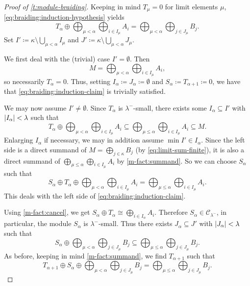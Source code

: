 \documentclass[a4paper,11pt,oneside]{amsart}
\theoremstyle{remark}
\DeclarePairedDelimiter{\card}{\lvert}{\rvert}
\newcommand{\cC}{\mathcal C}
\begin{document}
\begin{proof}[Proof of \cref{t:module-braiding}]
  Keeping in mind $T_\mu=0$ for limit elements $\mu$, \cref{eq:braiding:induction-hypothesis} yields
  \begin{equation} \label{eq:limit-sum-finite}
    T_{\alpha} \oplus \bigoplus_{\mu < \alpha} \bigoplus_{i \in I_\mu} A_i = \bigoplus_{\mu < \alpha} \bigoplus_{j \in J_\mu} B_j.
  \end{equation}
  Set $I' \coloneqq \kappa \setminus \bigcup_{\mu < \alpha} I_\mu$ and $J' \coloneqq \kappa \setminus \bigcup_{\mu < \alpha} J_\mu$.

  We first deal with the (trivial) case $I'=\emptyset$.
  Then 
  \begin{equation} \label{eq:braiding:limit-sum}
    M = \bigoplus_{\mu < \alpha} \bigoplus_{i \in I_\mu} A_i,
  \end{equation}
  so necessarily $T_\alpha=0$.
  Thus, setting $I_\alpha\coloneqq J_\alpha\coloneqq \emptyset$ and $S_\alpha\coloneqq T_{\alpha+1}\coloneqq 0$, we have that \cref{eq:braiding:induction-claim} is trivially satisfied.

  We may now assume $I' \ne \emptyset$.
  Since $T_\alpha$ is $\lambda^-$-small, there exists some $I_\alpha \subseteq I'$ with $\card{I_\alpha} < \lambda$ such that
  \[
    T_{\alpha} \oplus \bigoplus_{\mu < \alpha} \bigoplus_{i \in I_\mu} A_i \subseteq \bigoplus_{\mu \le \alpha} \bigoplus_{i \in I_\mu} A_i \subseteq M.
  \]
  Enlarging $I_\alpha$ if necessary, we may in addition assume $\min I' \in I_\alpha$.
  Since the left side is a direct summand of $M = \bigoplus_{j \in \kappa} B_j$ (by \cref{eq:limit-sum-finite}), it is also a direct summand of $\bigoplus_{\mu \le \alpha} \bigoplus_{i \in I_\mu} A_i$ by \ref{m-fact:summand}.
  So we can choose $S_\alpha$ such that
  \[
    S_\alpha \oplus T_{\alpha} \oplus \bigoplus_{\mu < \alpha} \bigoplus_{i \in I_\mu} A_i = \bigoplus_{\mu \le \alpha} \bigoplus_{i \in I_\mu} A_i.
  \]
  This deals with the left side of \cref{eq:braiding:induction-claim}.

  Using \ref{m-fact:cancel}, we get $S_\alpha \oplus T_\alpha \cong \bigoplus_{i \in I_\alpha} A_i$.
  Therefore $S_\alpha \in \cC_{\lambda^-}$, in particular, the module $S_\alpha$ is $\lambda^-$-small.
  Thus there exists $J_\alpha \subseteq J'$ with $\card{J_\alpha} < \lambda$ such that
  \[
    S_\alpha \oplus \bigoplus_{\mu < \alpha} \bigoplus_{j \in J_\mu} B_j \subseteq \bigoplus_{\mu \le \alpha} \bigoplus_{j \in J_\mu} B_j.
  \]
  As before, keeping in mind \ref{m-fact:summand}, we find $T_{\alpha+1}$ such that
  \[
    T_{\alpha+1} \oplus S_\alpha \oplus \bigoplus_{\mu < \alpha} \bigoplus_{j \in J_\mu} B_j = \bigoplus_{\mu \le \alpha} \bigoplus_{j \in J_\mu} B_j.
  \]


\end{proof}
\end{document}
